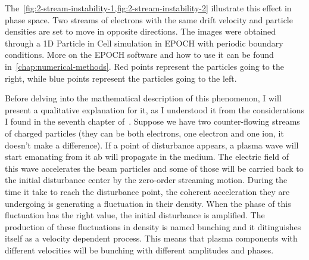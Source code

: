 \documentclass[12pt, class=report, crop=false]{standalone}
\begin{document}
The~\cref{fig:2-stream-instability-1,fig:2-stream-instability-2} illustrate this effect in phase space. Two streams of electrons with the same drift velocity and particle densities are set to move in opposite directions. The images were obtained through a 1D Particle in Cell simulation in EPOCH with periodic boundary conditions. More on the EPOCH software and how to use it can be found in~\cref{chap:numerical-methods}. Red points represent the particles going to the right, while blue points represent the particles going to the left.

Before delving into the mathematical description of this phenomenon, I will present a qualitative explanation for it, as I understood it from the considerations I found in the seventh chapter of~\cite{stixWavesPlasmas1992}. Suppose we have two counter-flowing streams of charged particles (they can be both electrons, one electron and one ion, it doesn't make a difference). If a point of disturbance appears, a plasma wave will start emanating from it ab will propagate in the medium. The electric field of this wave accelerates the beam particles and some of those will be carried back to the initial disturbance center by the zero-order streaming motion. During the time it take to reach the disturbance point, the coherent acceleration they are undergoing is generating a fluctuation in their density. When the phase of this fluctuation has the right value, the initial disturbance is amplified. The production of these fluctuations in density is named bunching and it ditinguishes itself as a velocity dependent process. This means that plasma components with different velocities will be bunching with different amplitudes and phases.
\end{document}
